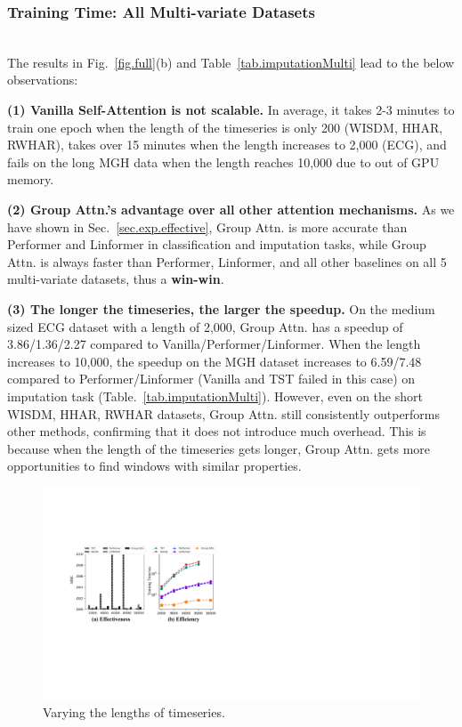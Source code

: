 \subsubsection{Training Time: All Multi-variate Datasets\nopunct}\ \\
\label{sec.exp.efficiency.all}
The results in Fig.~\ref{fig.full}(b) and Table~\ref{tab.imputationMulti} lead to the below observations: 

\textbf{(1) Vanilla Self-Attention is not scalable.} In average, it takes 2-3 minutes to train one epoch when the length of the timeseries is only 200 (WISDM, HHAR, RWHAR), takes over 15 minutes when the length increases to 2,000 (ECG), and fails on the long MGH data when the length reaches 10,000 due to out of GPU memory.  

\textbf{(2) Group Attn.'s advantage over all other attention mechanisms.} 
As we have shown in Sec.~\ref{sec.exp.effective}, Group Attn. is more accurate than Performer and Linformer in classification and imputation tasks, while Group Attn. is always faster than Performer, Linformer, and all other baselines on all 5 multi-variate datasets, thus a {\bf win-win}.

\textbf{(3) The longer the timeseries, the larger the speedup.} 
On the medium sized ECG dataset with a length of 2,000, Group Attn. has a speedup of 3.86/1.36/2.27 compared to Vanilla/Performer/Linformer. When the length increases to 10,000, the speedup on the MGH dataset increases to 6.59/7.48 compared to Performer/Linformer (Vanilla and TST failed in this case) on imputation task (Table.~\ref{tab.imputationMulti}). 
However, even on the short WISDM, HHAR, RWHAR datasets, Group Attn. still consistently outperforms other methods, confirming that it does not introduce much overhead.  
This is because when the length of the timeseries gets longer, Group Attn. gets more opportunities to find windows with similar properties.

\begin{figure}[t]
    \centering
    \includegraphics[width=1.0\columnwidth]{figures/line_flat.pdf}
    \vspace{-7mm}
    \caption{Varying the lengths of timeseries.}
    \label{fig.length}
    \vspace{-2mm}
\end{figure}

